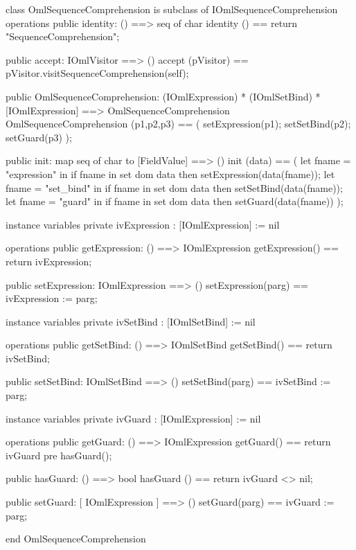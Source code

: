 \begin{vdm_al}
class OmlSequenceComprehension is subclass of IOmlSequenceComprehension
operations
  public identity: () ==> seq of char
  identity () == return "SequenceComprehension";

  public accept: IOmlVisitor ==> ()
  accept (pVisitor) == pVisitor.visitSequenceComprehension(self);

  public OmlSequenceComprehension:
      (IOmlExpression) *
      (IOmlSetBind) *
      [IOmlExpression] ==> OmlSequenceComprehension
  OmlSequenceComprehension (p1,p2,p3) == 
   ( setExpression(p1);
     setSetBind(p2);
     setGuard(p3) );

  public init: map seq of char to [FieldValue] ==> ()
  init (data) ==
    ( let fname = "expression" in
        if fname in set dom data
        then setExpression(data(fname));
      let fname = "set_bind" in
        if fname in set dom data
        then setSetBind(data(fname));
      let fname = "guard" in
        if fname in set dom data
        then setGuard(data(fname)) );

instance variables
  private ivExpression : [IOmlExpression] := nil

operations
  public getExpression: () ==> IOmlExpression
  getExpression() == return ivExpression;

  public setExpression: IOmlExpression ==> ()
  setExpression(parg) == ivExpression := parg;

instance variables
  private ivSetBind : [IOmlSetBind] := nil

operations
  public getSetBind: () ==> IOmlSetBind
  getSetBind() == return ivSetBind;

  public setSetBind: IOmlSetBind ==> ()
  setSetBind(parg) == ivSetBind := parg;

instance variables
  private ivGuard : [IOmlExpression] := nil

operations
  public getGuard: () ==> IOmlExpression
  getGuard() == return ivGuard
    pre hasGuard();

  public hasGuard: () ==> bool
  hasGuard () == return ivGuard <> nil;

  public setGuard: [ IOmlExpression ] ==> ()
  setGuard(parg) == ivGuard := parg;

end OmlSequenceComprehension
\end{vdm_al}

